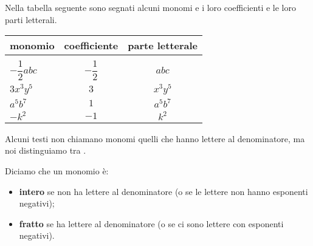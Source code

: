 \begin{esempio}{}{}
Nella tabella seguente sono segnati alcuni monomi e i loro coefficienti 
e le loro parti letterali.

\vspace{-1em}
\begin{center}
\begin{tabular}{lcc}
monomio & coefficiente & parte letterale \\
\hline \\[-.5em]
\(-{\dfrac{1}{2}}abc\) & \(-{\dfrac{1}{2}}\) & \(abc\) \\[1em]
\(3x^{3}y^{5}\) & \(3\) & \(x^{3}y^{5}\) \\[.5em]
\(a^{5}b^{7}\) & \(1\) & \(a^{5}b^{7}\) \\[.5em]
\(-k^{2}\) & \(-1\) & \(k^{2}\) %
\end{tabular}
\end{center}
\end{esempio}

% 
% 

Alcuni testi non chiamano monomi quelli che hanno lettere al 
denominatore, ma noi distinguiamo tra 
.

\begin{definizione}{}{}
Diciamo che un monomio è: 
\begin{itemize} [nosep]
\item \textbf{intero} se non ha lettere al denominatore
(o se le lettere non hanno esponenti negativi);
\item \textbf{fratto} se ha lettere al denominatore
(o se ci sono lettere con esponenti negativi).
\end{itemize}
\end{definizione}

